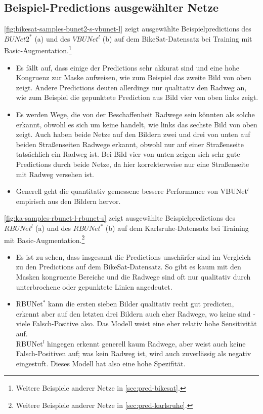 \subsection{Beispiel-Predictions ausgewählter Netze} \label{sec:example-preds}

\autoref{fig:bikesat-samples-bunet2-s-vbunet-l} zeigt ausgewählte Beispielpredictions des $BUNet2^*$ (a) und 
des $VBUNet^l$ (b) auf dem BikeSat-Datensatz bei Training mit Basic-Augmentation.\footnote{Weitere Beispiele anderer Netze in \autoref{sec:pred-bikesat}.}
\begin{itemize}
	\item Es fällt auf, dass einige der Predictions sehr akkurat sind und eine hohe Kongruenz zur Maske aufweisen,
	wie zum Beispiel das zweite Bild von oben zeigt. Andere Predictions deuten allerdings nur qualitativ den Radweg an, 
	wie zum Beispiel die gepunktete Prediction aus Bild vier von oben links zeigt.
	\item Es werden Wege, die von der Beschaffenheit Radwege sein könnten als solche erkannt, 
	obwohl es sich um keine handelt, wie links das sechste Bild von oben zeigt. Auch haben beide Netze 
	auf den Bildern zwei und drei von unten auf beiden Straßenseiten Radwege erkannt, obwohl nur auf einer Straßenseite tatsächlich ein Radweg ist.
	Bei Bild vier von unten zeigen sich sehr gute Predictions durch beide Netze, da hier korrekterweise nur eine Straßenseite 
	mit Radweg versehen ist. 
	\item Generell geht die quantitativ gemessene bessere Performance von VBUNet$^l$ empirisch aus den Bildern hervor.
\end{itemize}

\autoref{fig:ka-samples-rbunet-l-rbunet-s} zeigt ausgewählte Beispielpredictions des $RBUNet^l$ (a) und 
des $RBUNet^*$ (b) auf dem Karlsruhe-Datensatz bei Training mit Basic-Augmentation.\footnote{Weitere Beispiele anderer Netze in \autoref{sec:pred-karlsruhe}.}
\begin{itemize}
	\item Es ist zu sehen, dass insgesamt die Predictions unschärfer sind im Vergleich zu den Predictions auf dem 
	BikeSat-Datensatz. So gibt es kaum mit den Masken kongruente Bereiche und die Radwege sind oft nur 
	qualitativ durch unterbrochene oder gepunktete Linien angedeutet. 
	\item RBUNet$^*$ kann die ersten sieben Bilder qualitativ recht gut predicten, erkennt aber auf den letzten 
	drei Bildern auch eher Radwege, wo keine sind - viele Falsch-Positive also. 
	Das Modell weist eine eher relativ hohe Sensitivität auf. \\
	RBUNet$^l$ hingegen erkennt generell kaum Radwege, aber weist auch keine Falsch-Positiven auf; 
	was kein Radweg ist, wird auch zuverlässig als negativ eingestuft. Dieses Modell hat also eine hohe Spezifität.     
\end{itemize}

